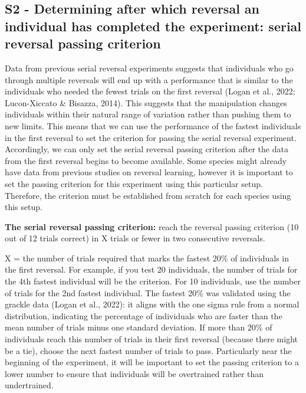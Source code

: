 \documentclass[
]{article}
\begin{document}
\subsection{S2 - Determining after which reversal an individual has
completed the experiment: serial reversal passing
criterion}\label{s2---determining-after-which-reversal-an-individual-has-completed-the-experiment-serial-reversal-passing-criterion}

Data from previous serial reversal experiments suggests that individuals
who go through multiple reversals will end up with a performance that is
similar to the individuals who needed the fewest trials on the first
reversal (Logan et al., 2022; Lucon-Xiccato \& Bisazza, 2014). This
suggests that the manipulation changes individuals within their natural
range of variation rather than pushing them to new limits. This means
that we can use the performance of the fastest individuals in the first
reversal to set the criterion for passing the serial reversal
experiment. Accordingly, we can only set the serial reversal passing
criterion after the data from the first reversal begins to become
available. Some species might already have data from previous studies on
reversal learning, however it is important to set the passing criterion
for this experiment using this particular setup. Therefore, the
criterion must be established from scratch for each species using this
setup.

\textbf{The serial reversal passing criterion:} reach the reversal
passing criterion (10 out of 12 trials correct) in X trials or fewer in
two consecutive reversals.

X = the number of trials required that marks the fastest 20\% of
individuals in the first reversal. For example, if you test 20
individuals, the number of trials for the 4th fastest individual will be
the criterion. For 10 individuals, use the number of trials for the 2nd
fastest individual. The fastest 20\% was validated using the grackle
data (Logan et al., 2022): it aligns with the one sigma rule from a
normal distribution, indicating the percentage of individuals who are
faster than the mean number of trials minus one standard deviation. If
more than 20\% of individuals reach this number of trials in their first
reversal (because there might be a tie), choose the next fastest number
of trials to pass. Particularly near the beginning of the experiment, it
will be important to set the passing criterion to a lower number to
ensure that individuals will be overtrained rather than undertrained.
\end{document}
